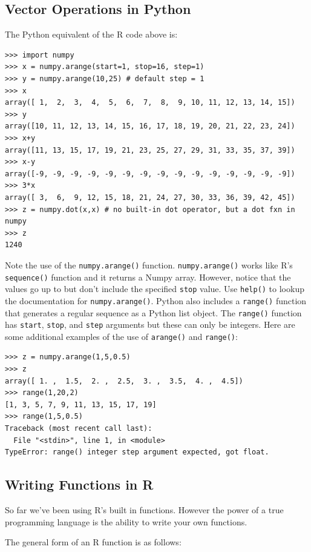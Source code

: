 \documentclass{article}
\begin{document}
\subsection{Vector Operations in Python}

The Python equivalent of the R code above is:

\begin{lstlisting}
>>> import numpy
>>> x = numpy.arange(start=1, stop=16, step=1)
>>> y = numpy.arange(10,25) # default step = 1
>>> x
array([ 1,  2,  3,  4,  5,  6,  7,  8,  9, 10, 11, 12, 13, 14, 15])
>>> y
array([10, 11, 12, 13, 14, 15, 16, 17, 18, 19, 20, 21, 22, 23, 24])
>>> x+y
array([11, 13, 15, 17, 19, 21, 23, 25, 27, 29, 31, 33, 35, 37, 39])
>>> x-y
array([-9, -9, -9, -9, -9, -9, -9, -9, -9, -9, -9, -9, -9, -9, -9])
>>> 3*x
array([ 3,  6,  9, 12, 15, 18, 21, 24, 27, 30, 33, 36, 39, 42, 45])
>>> z = numpy.dot(x,x) # no built-in dot operator, but a dot fxn in numpy
>>> z
1240
\end{lstlisting}
Note the use of the \lstinline!numpy.arange()! function.
\lstinline!numpy.arange()! works like R's \lstinline!sequence()!
function and it returns a Numpy array. However, notice that the values
go up to but don't include the specified \lstinline!stop! value. Use
\lstinline!help()! to lookup the documentation for
\lstinline!numpy.arange()!. Python also includes a \lstinline!range()!
function that generates a regular sequence as a Python list object. The
\lstinline!range()! function has \lstinline!start!, \lstinline!stop!,
and \lstinline!step! arguments but these can only be integers. Here are
some additional examples of the use of \lstinline!arange()! and
\lstinline!range()!:

\begin{lstlisting}
>>> z = numpy.arange(1,5,0.5) 
>>> z
array([ 1. ,  1.5,  2. ,  2.5,  3. ,  3.5,  4. ,  4.5])
>>> range(1,20,2)
[1, 3, 5, 7, 9, 11, 13, 15, 17, 19]
>>> range(1,5,0.5)
Traceback (most recent call last):
  File "<stdin>", line 1, in <module>
TypeError: range() integer step argument expected, got float.
\end{lstlisting}
\subsection{Writing Functions in R}

So far we've been using R's built in functions. However the power of a
true programming language is the ability to write your own functions.

The general form of an R function is as follows:
\end{document}
